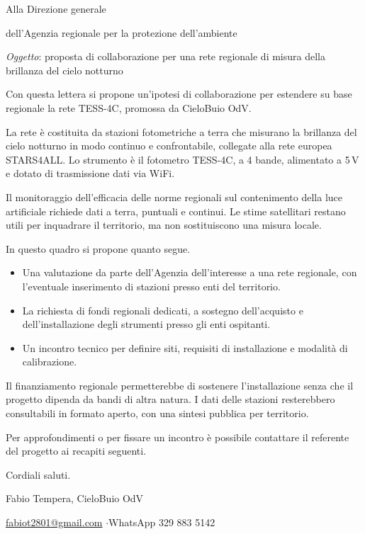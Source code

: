 \documentclass[11pt,a4paper]{report}
\begin{document}
\noindent Alla Direzione generale

\noindent dell'Agenzia regionale per la protezione dell'ambiente

\vspace{0.8cm}

\noindent \textit{Oggetto}: proposta di collaborazione per una rete regionale di misura della brillanza del cielo notturno

\vspace{0.8cm}

\noindent Con questa lettera si propone un'ipotesi di collaborazione per estendere su base regionale la rete TESS-4C, promossa da CieloBuio OdV.

La rete è costituita da stazioni fotometriche a terra che misurano la brillanza del cielo notturno in modo continuo e confrontabile, collegate alla rete europea STARS4ALL. Lo strumento è il fotometro TESS-4C, a 4 bande, alimentato a 5\,V e dotato di trasmissione dati via WiFi.

Il monitoraggio dell'efficacia delle norme regionali sul contenimento della luce artificiale richiede dati a terra, puntuali e continui. Le stime satellitari restano utili per inquadrare il territorio, ma non sostituiscono una misura locale.

In questo quadro si propone quanto segue.

\begin{itemize}
\item Una valutazione da parte dell'Agenzia dell'interesse a una rete regionale, con l'eventuale inserimento di stazioni presso enti del territorio.
\item La richiesta di fondi regionali dedicati, a sostegno dell'acquisto e dell'installazione degli strumenti presso gli enti ospitanti.
\item Un incontro tecnico per definire siti, requisiti di installazione e modalità di calibrazione.
\end{itemize}

Il finanziamento regionale permetterebbe di sostenere l'installazione senza che il progetto dipenda da bandi di altra natura. I dati delle stazioni resterebbero consultabili in formato aperto, con una sintesi pubblica per territorio.

Per approfondimenti o per fissare un incontro è possibile contattare il referente del progetto ai recapiti seguenti.

\vspace{0.6cm}

\noindent Cordiali saluti.

\vspace{1.2cm}

\noindent Fabio Tempera, CieloBuio OdV

\noindent \url{fabiot2801@gmail.com} \quad$\cdot$\quad WhatsApp 329 883 5142
\end{document}
